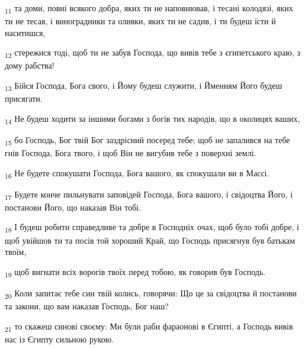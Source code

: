 \begin{tcolorbox}
\textsubscript{11} та доми, повні всякого добра, яких ти не наповнював, і тесані колодязі, яких ти не тесав, і виноградники та оливки, яких ти не садив, і ти будеш їсти й наситишся,
\end{tcolorbox}
\begin{tcolorbox}
\textsubscript{12} стережися тоді, щоб ти не забув Господа, що вивів тебе з єгипетського краю, з дому рабства!
\end{tcolorbox}
\begin{tcolorbox}
\textsubscript{13} Бійся Господа, Бога свого, і Йому будеш служити, і Йменням Його будеш присягати.
\end{tcolorbox}
\begin{tcolorbox}
\textsubscript{14} Не будеш ходити за іншими богами з богів тих народів, що в околицях ваших,
\end{tcolorbox}
\begin{tcolorbox}
\textsubscript{15} бо Господь, Бог твій Бог заздрісний посеред тебе; щоб не запалився на тебе гнів Господа, Бога твого, і щоб Він не вигубив тебе з поверхні землі.
\end{tcolorbox}
\begin{tcolorbox}
\textsubscript{16} Не будете спокушати Господа, Бога вашого, як спокушали ви в Массі.
\end{tcolorbox}
\begin{tcolorbox}
\textsubscript{17} Будете конче пильнувати заповідей Господа, Бога вашого, і свідоцтва Його, і постанови Його, що наказав Він тобі.
\end{tcolorbox}
\begin{tcolorbox}
\textsubscript{18} І будеш робити справедливе та добре в Господніх очах, щоб було тобі добре, і щоб увійшов ти та посів той хороший Край, що Господь присягнув був батькам твоїм,
\end{tcolorbox}
\begin{tcolorbox}
\textsubscript{19} щоб вигнати всіх ворогів твоїх перед тобою, як говорив був Господь.
\end{tcolorbox}
\begin{tcolorbox}
\textsubscript{20} Коли запитає тебе син твій колись, говорячи: Що це за свідоцтва й постанови та закони, що вам наказав Господь, Бог наш?
\end{tcolorbox}
\begin{tcolorbox}
\textsubscript{21} то скажеш синові своєму: Ми були раби фараонові в Єгипті, а Господь вивів нас із Єгипту сильною рукою.
\end{tcolorbox}
